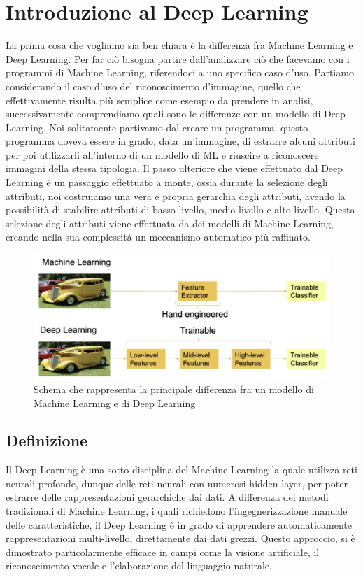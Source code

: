 \chapter{Introduzione al Deep Learning}

La prima cosa che vogliamo sia ben chiara è la differenza fra Machine Learning e Deep Learning. Per far ciò bisogna partire dall'analizzare ciò che facevamo con i programmi di Machine Learning, riferendoci a uno specifico caso d'uso. Partiamo considerando il caso d'uso del riconoscimento d'immagine, quello che effettivamente risulta più semplice come esempio da prendere in analisi, successivamente comprendiamo quali sono le differenze con un modello di Deep Learning. Noi solitamente partivamo dal creare un programma, questo programma doveva essere in grado, data un'immagine, di estrarre alcuni attributi per poi utilizzarli all'interno di un modello di ML e riuscire a riconoscere immagini della stessa tipologia. Il passo ulteriore che viene effettuato dal Deep Learning è un passaggio effettuato a monte, ossia durante la selezione degli attributi, noi costruiamo una vera e propria gerarchia degli attributi, avendo la possibilità di stabilire attributi di basso livello, medio livello e alto livello. Questa selezione degli attributi viene effettuata da dei modelli di Machine Learning, creando nella sua complessità un meccanismo automatico più raffinato.

\begin{figure}
    \centering
    \includegraphics[width=0.75\linewidth]{figure/DeepMachineDiff.png}
    \caption{Schema che rappresenta la principale differenza fra un modello di Machine Learning e di Deep Learning}
    \label{fig:DLMLDiff}
\end{figure}

\section{Definizione}
Il Deep Learning è una sotto-disciplina del Machine Learning la quale utilizza reti neurali profonde, dunque delle reti neurali con numerosi hidden-layer, per poter estrarre delle rappresentazioni gerarchiche dai dati. A differenza dei metodi tradizionali di Machine Learning, i quali richiedono l'ingegnerizzazione manuale delle caratteristiche, il Deep Learning è in grado di apprendere automaticamente rappresentazioni multi-livello, direttamente dai dati grezzi. Questo approccio, si è dimostrato particolarmente efficace in campi come la visione artificiale, il riconoscimento vocale e l'elaborazione del linguaggio naturale.

